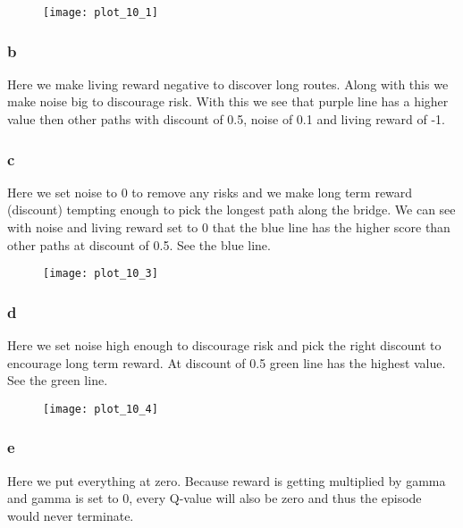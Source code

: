 \begin{figure}[H]
\caption{}
\centering
\texttt{[image: plot\_10\_1]}
\label{fig:e101}
\end{figure}

\subsubsection{b}
Here we make living reward negative to discover long routes. Along with this we make noise big to discourage risk. With this we see that purple line has a higher value then other paths with discount of 0.5, noise of 0.1 and living reward of -1.

\subsubsection{c}
Here we set noise to 0 to remove any risks and we make long term reward (discount) tempting enough to pick the longest path along the bridge. We can see with noise and living reward set to 0 that the blue line has the higher score than other paths at discount of 0.5. See  the blue line.

\begin{figure}[H]
\caption{}
\centering
\texttt{[image: plot\_10\_3]}
\label{fig:e103}
\end{figure}

\subsubsection{d}
Here we set noise high enough to discourage risk and pick the right discount to encourage long term reward. At discount of 0.5 green line has the highest value. See  the green line.

\begin{figure}[H]
\caption{}
\centering
\texttt{[image: plot\_10\_4]}
\label{fig:e104}
\end{figure}

\subsubsection{e}
Here we put everything at zero. Because reward is getting multiplied by gamma and gamma is set to 0, every Q-value will also be zero and thus the episode would never terminate.